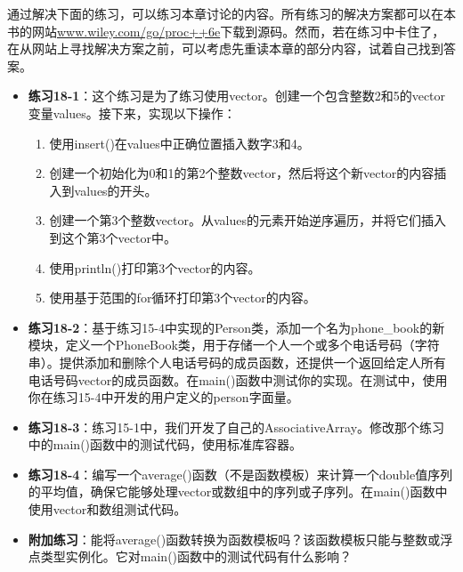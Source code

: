 通过解决下面的练习，可以练习本章讨论的内容。所有练习的解决方案都可以在本书的网站\url{www.wiley.com/go/proc++6e}下载到源码。然而，若在练习中卡住了，在从网站上寻找解决方案之前，可以考虑先重读本章的部分内容，试着自己找到答案。

\begin{itemize}
\item
\textbf{练习18-1}：这个练习是为了练习使用vector。创建一个包含整数2和5的vector变量values。接下来，实现以下操作：
\begin{enumerate}
\item
使用insert()在values中正确位置插入数字3和4。

\item
创建一个初始化为0和1的第2个整数vector，然后将这个新vector的内容插入到values的开头。

\item
创建一个第3个整数vector。从values的元素开始逆序遍历，并将它们插入到这个第3个vector中。

\item
使用println()打印第3个vector的内容。

\item
使用基于范围的for循环打印第3个vector的内容。
\end{enumerate}

\item
\textbf{练习18-2}：基于练习15-4中实现的Person类，添加一个名为phone\_book的新模块，定义一个PhoneBook类，用于存储一个人一个或多个电话号码（字符串）。提供添加和删除个人电话号码的成员函数，还提供一个返回给定人所有电话号码vector的成员函数。在main()函数中测试你的实现。在测试中，使用你在练习15-4中开发的用户定义的person字面量。

\item
\textbf{练习18-3}：练习15-1中，我们开发了自己的AssociativeArray。修改那个练习中的main()函数中的测试代码，使用标准库容器。

\item
\textbf{练习18-4}：编写一个average()函数（不是函数模板）来计算一个double值序列的平均值，确保它能够处理vector或数组中的序列或子序列。在main()函数中使用vector和数组测试代码。

\item
\textbf{附加练习}：能将average()函数转换为函数模板吗？该函数模板只能与整数或浮点类型实例化。它对main()函数中的测试代码有什么影响？
\end{itemize}















